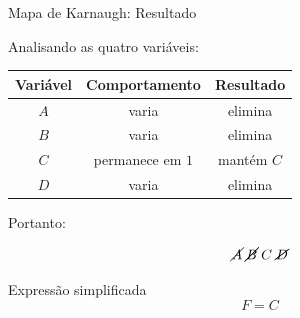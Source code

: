 \begin{frame}{Mapa de Karnaugh: Resultado}
    \small

    Analisando as quatro variáveis:

    \begin{center}
        \begin{tabular}{c|c|c}
            Variável & Comportamento & Resultado \\ \hline
            $A$ & varia & elimina \\
            $B$ & varia & elimina \\
            $C$ & permanece em $1$ & mantém $C$ \\
            $D$ & varia & elimina
        \end{tabular}
    \end{center}

    \vspace{0.5cm}

    Portanto:

    \[
        \cancel{A}\;
        \cancel{B}\;
        C\;
        \cancel{D}
    \]

    \begin{alertblock}{Expressão simplificada}
        \[
            \boxed{F=C}
        \]
    \end{alertblock}

\end{frame}